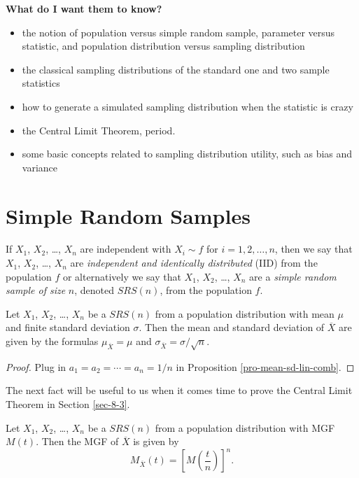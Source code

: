 \documentclass[captions=tableheading]{scrbook}
\begin{document}
\textbf{What do I want them to know?}
\begin{itemize}
\item the notion of population versus simple random sample, parameter versus statistic, and population distribution versus sampling distribution
\item the classical sampling distributions of the standard one and two sample statistics
\item how to generate a simulated sampling distribution when the statistic is crazy
\item the Central Limit Theorem, period.
\item some basic concepts related to sampling distribution utility, such as bias and variance
\end{itemize}
\section{Simple Random Samples}
\label{sec-8-1}
\label{sec-simple-random-samples}


\begin{defn}
If \(X_{1}\), \(X_{2}\), \ldots{}, \(X_{n}\) are independent with \(X_{i}\sim f\) for \(i=1,2,\ldots,n\), then we say that \(X_{1}\), \(X_{2}\), \ldots{}, \(X_{n}\) are \emph{independent and identically distributed} (IID) from the population \(f\) or alternatively we say that \(X_{1}\), \(X_{2}\), \ldots{}, \(X_{n}\) are a \emph{simple random sample of size} \(n\), denoted \(SRS(n)\), from the population \(f\). 
\end{defn}

\begin{prop}
Let \(X_{1}\), \(X_{2}\), \ldots{}, \(X_{n}\) be a \(SRS(n)\) from a population distribution with mean \(\mu\) and finite standard deviation \(\sigma\). Then the mean and standard deviation of \(\overline{X}\) are given by the formulas \(\mu_{\overline{X}}=\mu\) and \(\sigma_{\overline{X}}=\sigma/\sqrt{n}\).
\end{prop}

\begin{proof}
Plug in \(a_{1}=a_{2}=\cdots=a_{n}=1/n\) in Proposition \ref{pro-mean-sd-lin-comb}.
\end{proof}

The next fact will be useful to us when it comes time to prove the Central Limit Theorem in Section \ref{sec-8-3}.

\begin{prop}
Let \(X_{1}\), \(X_{2}\), \ldots{}, \(X_{n}\) be a \(SRS(n)\) from a population distribution with MGF \(M(t)\). Then the MGF of \(\overline{X}\) is given by
\begin{equation}
M_{\overline{X}}(t)=\left[M\left(\frac{t}{n}\right)\right]^{n}.
\end{equation}
\end{prop}
\end{document}
